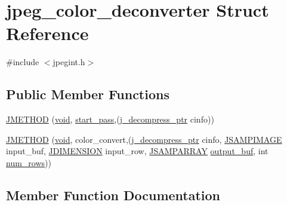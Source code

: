 \hypertarget{structjpeg__color__deconverter}{}\section{jpeg\+\_\+color\+\_\+deconverter Struct Reference}
\label{structjpeg__color__deconverter}


{\ttfamily \#include $<$jpegint.\+h$>$}

\subsection*{Public Member Functions}
\begin{DoxyCompactItemize}
\item 
\hyperlink{structjpeg__color__deconverter_a90ddfc502a2aadc44f157007a3e49056}{J\+M\+E\+T\+H\+O\+D} (\hyperlink{png_8h_aa8c59027f9ab2769342f248709d68d17}{void}, \hyperlink{jddctmgr_8c_a1964f006adb8fb80f57e455f6452aec1}{start\+\_\+pass},(\hyperlink{jpeglib_8h_a00c7d78af44bd26a901c791ccfc1e178}{j\+\_\+decompress\+\_\+ptr} cinfo))
\item 
\hyperlink{structjpeg__color__deconverter_ab0fedad382d6b40b3698181271bb4ba4}{J\+M\+E\+T\+H\+O\+D} (\hyperlink{png_8h_aa8c59027f9ab2769342f248709d68d17}{void}, color\+\_\+convert,(\hyperlink{jpeglib_8h_a00c7d78af44bd26a901c791ccfc1e178}{j\+\_\+decompress\+\_\+ptr} cinfo, \hyperlink{jpeglib_8h_a4bf858e4d42202287e786bdec2f3b62b}{J\+S\+A\+M\+P\+I\+M\+A\+G\+E} input\+\_\+buf, \hyperlink{jmorecfg_8h_a04ed4674f6f1d0d50ec241531e38274f}{J\+D\+I\+M\+E\+N\+S\+I\+O\+N} input\+\_\+row, \hyperlink{jpeglib_8h_ac9d5d1b829ed51769db69a37271a7e91}{J\+S\+A\+M\+P\+A\+R\+R\+A\+Y} \hyperlink{jdct_8h_ad7e4660a191b1a791748dd44d5a7a0ec}{output\+\_\+buf}, int \hyperlink{jpegint_8h_ac5f8b57092da0f421713ba171c4c9f87}{num\+\_\+rows}))
\end{DoxyCompactItemize}


\subsection{Member Function Documentation}
\hypertarget{structjpeg__color__deconverter_a90ddfc502a2aadc44f157007a3e49056}{}
